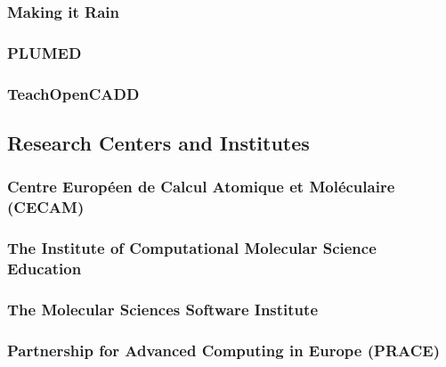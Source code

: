 \documentclass[9pt,review]{livecoms}
\begin{document}
\subsubsection{Making it Rain}



\subsubsection{PLUMED}



\subsubsection{TeachOpenCADD}



\subsection{Research Centers and Institutes}

\subsubsection{Centre Européen de Calcul Atomique et Moléculaire (CECAM)}



\subsubsection{The Institute of Computational Molecular Science Education}


\subsubsection{The Molecular Sciences Software Institute}


\subsubsection{Partnership for Advanced Computing in Europe (PRACE)}


\end{document}
